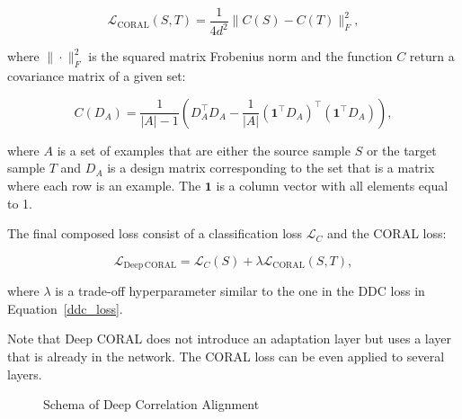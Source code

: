 \begin{equation}
	\mathcal{L}_{\mathrm{CORAL}}(S, T) = \frac{1}{4 d^2} \|C(S) - C(T)\|_F^2,
	\label{coral_loss}
\end{equation}

where \(\|\cdot\|_F^2\) is the squared matrix Frobenius norm
and the function \(C\) return a covariance matrix of a given set:

\begin{equation}
	C(D_A) = \frac{1}{|A| - 1} (D_A^\top D_A
	- \frac{1}{|A|} (\mathbf{1}^\top D_A)^\top (\mathbf{1}^\top D_A)),
	\label{deep_coral_loss}
\end{equation}

where \(A\) is a set of examples
that are either the source sample \(S\) or the target sample \(T\)
and \(D_A\) is a design matrix corresponding to the set
that is a matrix where each row is an example.
The \(\mathbf{1}\) is a column vector with all elements equal to 1.

The final composed loss consist of a classification loss \(\mathcal{L}_C\)
and the CORAL loss:

\begin{equation}
	\mathcal{L}_{\mathrm{Deep\,CORAL}}
	= \mathcal{L}_C(S) + \lambda \mathcal{L}_{\mathrm{CORAL}}(S, T),
\end{equation}

where \(\lambda\) is a trade-off hyperparameter similar to the one in the DDC loss in Equation~\ref{ddc_loss}.

Note that Deep CORAL does not introduce an adaptation layer
but uses a layer that is already in the network.
The CORAL loss can be even applied to several layers.

\begin{figure}
\begin{center}
\end{center}
\caption{Schema of Deep Correlation Alignment}
\end{figure}


